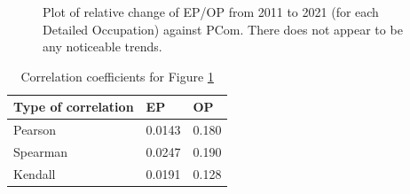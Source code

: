 \documentclass[11pt]{article}
\begin{document}
\begin{figure}[!htb]
	\centering
	\hfill
	\hfill
	\caption{Plot of relative change of EP/OP from 2011 to 2021 (for each Detailed Occupation) against PCom. There does not appear to be any noticeable trends.}
	\label{fig:Relative change against PCom}
\end{figure}

\begin{table}[]
	\centering
	\begin{tabular}{l|ll|ll}
	\textbf{Type of correlation} & \multicolumn{2}{l|}{\textbf{EP}} & \multicolumn{2}{l}{\textbf{OP}} \\ \hline
	Pearson                      & \multicolumn{2}{l|}{0.0143}     & \multicolumn{2}{l}{0.180}      \\ \hline
	Spearman                     & \multicolumn{2}{l|}{0.0247}      & \multicolumn{2}{l}{0.190}    \\ \hline
	Kendall                      & \multicolumn{2}{l|}{0.0191}      & \multicolumn{2}{l}{0.128}   
	\end{tabular}
	\caption{Correlation coefficients for Figure \ref{fig:Relative change against PCom}}
	\label{tab:correlation for relative}
	\end{table}
\end{document}
